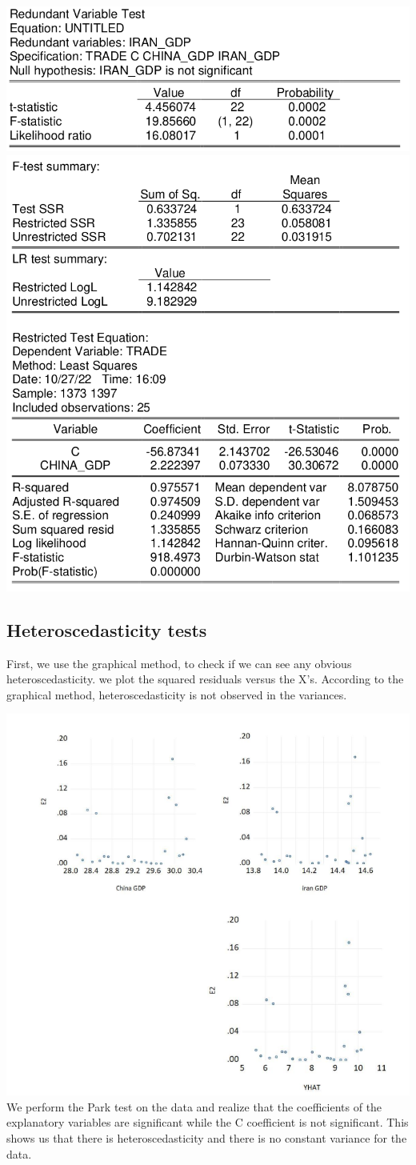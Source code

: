 \documentclass[12pt, letterpaper, twoside]{article}
\begin{document}
    \includegraphics[width=.6\textwidth,height=.6\textwidth,keepaspectratio,center]{8.png}
        \includegraphics[width=.6\textwidth,height=.6\textwidth,keepaspectratio,center]{9.png}
\subsection{Heteroscedasticity tests}
First, we use the graphical method, to check if we can see any obvious heteroscedasticity. we plot the squared residuals versus the X's. According to the graphical method, heteroscedasticity is not observed in the variances.

        \includegraphics[width=.5\textwidth,height=.5\textwidth,keepaspectratio,center]{10.png}
We perform the Park test on the data and realize that the coefficients of the explanatory variables are significant while the C coefficient is not significant. This shows us that there is heteroscedasticity and there is no constant variance for the data.
\end{document}
